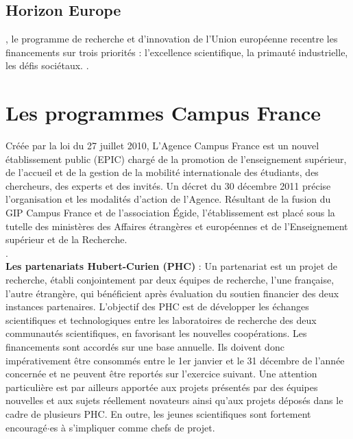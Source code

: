 \subsection{Horizon Europe}

, le programme de recherche et d'innovation de l'Union europ\'eenne 
recentre les financements sur trois priorit\'es : 
l'excellence scientifique, la primaut\'e industrielle, les d\'efis soci\'etaux. 
. \\


\section{Les programmes Campus France}

Cr\'e\'ee par la loi du 27 juillet 2010, L'Agence Campus France est un nouvel \'etablissement public (EPIC) charg\'e de la promotion de l'enseignement sup\'erieur, de l'accueil et de la gestion de la mobilit\'e internationale des \'etudiants, des chercheurs, des experts et des invit\'es. Un d\'ecret du 30 d\'ecembre 2011 pr\'ecise l'organisation et les modalit\'es d'action de l'Agence. R\'esultant de la fusion du GIP Campus France et de l'association \'Egide, l'\'etablissement est plac\'e sous la tutelle des minist\`eres des Affaires \'etrang\`eres et europ\'eennes et de l'Enseignement sup\'erieur et de la Recherche. \\
. \\

\textbf{Les partenariats Hubert-Curien (PHC)} :
\label{PHC}
Un partenariat est un projet de recherche, {\'e}tabli conjointement par deux {\'e}quipes de recherche, l'une fran\c{c}aise, l'autre {\'e}trang{\`e}re, qui b{\'e}n{\'e}ficient apr{\`e}s {\'e}valuation du soutien financier des deux instances partenaires.
L'objectif des PHC est de d{\'e}velopper les {\'e}changes scientifiques et technologiques entre les laboratoires de recherche des deux communaut{\'e}s scientifiques, en favorisant les nouvelles coop{\'e}rations. 
Les financements sont accord\'es sur une base annuelle. Ils doivent donc imp\'erativement \^etre consomm\'es entre le 1er janvier et le 31 d\'ecembre de l'ann\'ee concern\'ee et ne peuvent \^etre report\'es sur l'exercice suivant.
Une attention particuli{\`e}re est par ailleurs apport{\'e}e aux projets pr{\'e}sent{\'e}s par des {\'e}quipes nouvelles et aux sujets r{\'e}ellement novateurs ainsi qu'aux projets d{\'e}pos{\'e}s dans le cadre de plusieurs PHC. En outre, les jeunes scientifiques sont fortement encourag{\'e}$\cdot$es {\`a} s'impliquer comme chefs de projet.


